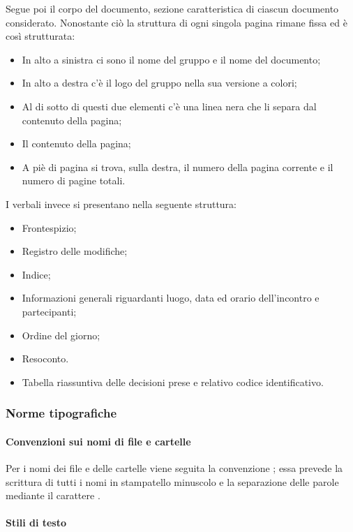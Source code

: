Segue poi il corpo del documento, sezione caratteristica di ciascun documento considerato. Nonostante ciò la struttura
di ogni singola pagina rimane fissa ed è così strutturata:
\begin{itemize}
    \item In alto a sinistra ci sono il nome del gruppo e il nome del documento;
    \item In alto a destra c'è il logo del gruppo nella sua versione a colori;
    \item Al di sotto di questi due elementi c'è una linea nera che li separa dal contenuto della pagina;
    \item Il contenuto della pagina;
    \item A piè di pagina si trova, sulla destra, il numero della pagina corrente e il numero di pagine totali.
\end{itemize}
I verbali invece si presentano nella seguente struttura:
\begin{itemize}
    \item Frontespizio;
    \item Registro delle modifiche;
    \item Indice;
    \item Informazioni generali riguardanti luogo, data ed orario dell'incontro e partecipanti;
    \item Ordine del giorno;
    \item Resoconto.
    \item Tabella riassuntiva delle decisioni prese e relativo codice identificativo.
\end{itemize}

\subsubsection{Norme tipografiche}
\label{ssub:norme_tipografiche}

\paragraph{Convenzioni sui nomi di file e cartelle}
\label{par:attribuzione_nome}

Per i nomi dei file e delle cartelle viene seguita la convenzione ; essa prevede la scrittura di tutti i nomi in stampatello
minuscolo e la separazione delle parole mediante il carattere .

\paragraph{Stili di testo}
\label{par:stili_testo}

